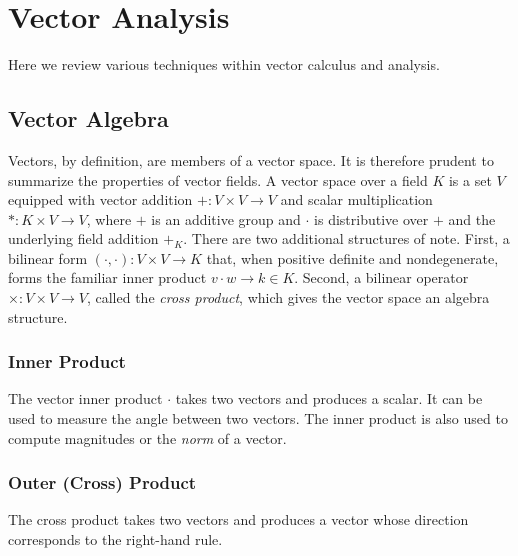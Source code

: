 \newpage
\chapter{Vector Analysis}
\label{app:vec-analysis}
Here we review various techniques within vector calculus and analysis. 

\section{Vector Algebra}
Vectors, by definition, are members of a vector space. It is therefore prudent to summarize the properties of vector fields. A vector space over a field $K$ is a set $V$ equipped with vector addition $+: V\times V \to V$ and scalar multiplication $*: K\times V \to V$, where $+$ is an additive group and $\cdot$ is distributive over $+$ and the underlying field addition $+_K$. There are two additional structures of note. First, a bilinear form $(\cdot,\cdot): V\times V\to K$ that, when positive definite and nondegenerate, forms the familiar inner product $v\cdot w \to k\in K$. Second, a bilinear operator $\times : V\times V \to V$, called the \textit{cross product}, which gives the vector space an algebra structure.

\subsection{Inner Product}
The vector inner product $\cdot$ takes two vectors and produces a scalar. It can be used to measure the angle between two vectors.
The inner product is also used to compute magnitudes or the \textit{norm} of a vector.

\subsection{Outer (Cross) Product}
The cross product takes two vectors and produces a vector whose direction corresponds to the right-hand rule.

